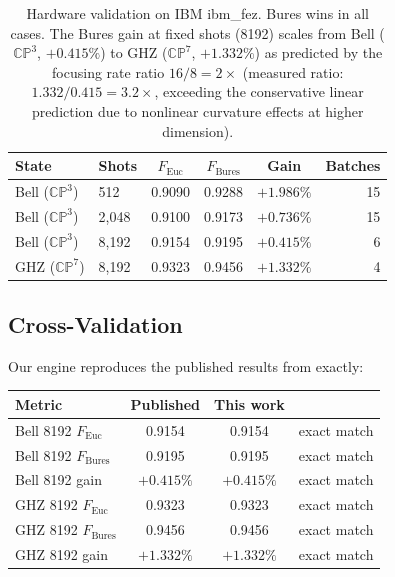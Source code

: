 \documentclass[12pt,a4paper]{article}
\begin{document}
\begin{table}[H]
\centering
\begin{tabular}{llcccr}
\toprule
State & Shots & $F_{\text{Euc}}$ & $F_{\text{Bures}}$ & Gain & Batches \\
\midrule
Bell ($\mathbb{CP}^3$) & 512 & 0.9090 & 0.9288 & $+1.986\%$ & 15 \\
Bell ($\mathbb{CP}^3$) & 2{,}048 & 0.9100 & 0.9173 & $+0.736\%$ & 15 \\
Bell ($\mathbb{CP}^3$) & 8{,}192 & 0.9154 & 0.9195 & $+0.415\%$ & 6 \\
GHZ ($\mathbb{CP}^7$) & 8{,}192 & 0.9323 & 0.9456 & $+1.332\%$ & 4 \\
\bottomrule
\end{tabular}
\caption{Hardware validation on IBM ibm\_fez. Bures wins in all cases. The Bures gain at fixed shots (8192) scales from Bell ($\mathbb{CP}^3$, $+0.415\%$) to GHZ ($\mathbb{CP}^7$, $+1.332\%$) as predicted by the focusing rate ratio $16/8 = 2\times$ (measured ratio: $1.332/0.415 = 3.2\times$, exceeding the conservative linear prediction due to nonlinear curvature effects at higher dimension).}
\label{tab:hardware}
\end{table}

\subsection{Cross-Validation}

Our engine reproduces the published results from \cite{muir2026} exactly:

\begin{center}
\begin{tabular}{lccl}
\toprule
Metric & Published & This work & \\
\midrule
Bell 8192 $F_{\text{Euc}}$ & 0.9154 & 0.9154 & exact match \\
Bell 8192 $F_{\text{Bures}}$ & 0.9195 & 0.9195 & exact match \\
Bell 8192 gain & $+0.415\%$ & $+0.415\%$ & exact match \\
GHZ 8192 $F_{\text{Euc}}$ & 0.9323 & 0.9323 & exact match \\
GHZ 8192 $F_{\text{Bures}}$ & 0.9456 & 0.9456 & exact match \\
GHZ 8192 gain & $+1.332\%$ & $+1.332\%$ & exact match \\
\bottomrule
\end{tabular}
\end{center}
\end{document}
